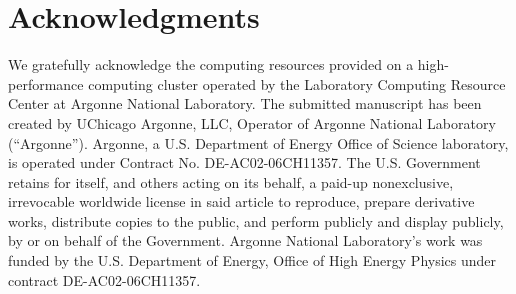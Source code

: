 \documentclass[final,1p,11pt]{elsarticle}
\begin{document}
\section*{Acknowledgments}
We gratefully acknowledge the computing resources provided on a
high-performance computing cluster operated by the
Laboratory Computing Resource Center at Argonne National Laboratory.
The submitted manuscript has been created by UChicago Argonne, LLC,
Operator of Argonne National Laboratory (“Argonne”). Argonne, a U.S.
Department of Energy Office of Science laboratory, is operated under
Contract No. DE-AC02-06CH11357. The U.S. Government retains for itself,
and others acting on its behalf, a paid-up nonexclusive, irrevocable
worldwide license in said article to reproduce, prepare derivative works,
distribute copies to the public, and perform publicly and display
publicly, by or on behalf of the Government.
Argonne National Laboratory’s work was
funded by the U.S. Department of Energy, Office of High Energy Physics
under contract DE-AC02-06CH11357.


\newpage


\def\bibname{\Large\bf References}


\clearpage

\appendix

\end{document}
